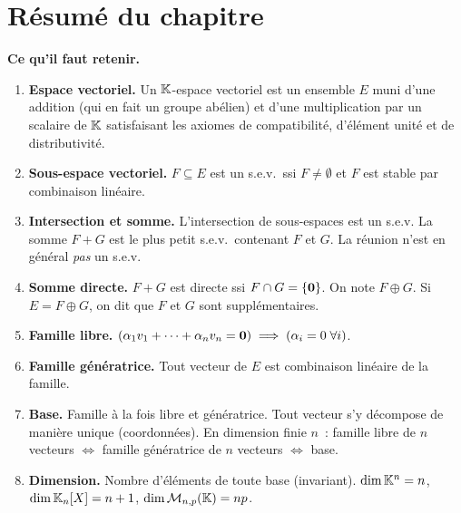 \section*{Résumé du chapitre}

\begin{framed}
\textbf{Ce qu'il faut retenir.}

\begin{enumerate}[label=\textbf{\arabic*.},leftmargin=2em]
  \item \textbf{Espace vectoriel.} Un ${\mathbb{K}}$-espace vectoriel est un
    ensemble $E$ muni d'une addition (qui en fait un groupe abélien) et
    d'une multiplication par un scalaire de ${\mathbb{K}}$ satisfaisant les
    axiomes de compatibilité, d'élément unité et de distributivité.

  \item \textbf{Sous-espace vectoriel.} $F\subseteq E$ est un s.e.v.\
    ssi $F\neq\emptyset$ et $F$ est stable par combinaison linéaire.

  \item \textbf{Intersection et somme.} L'intersection de sous-espaces
    est un s.e.v. La somme $F+G$ est le plus petit s.e.v.\ contenant
    $F$ et $G$. La réunion n'est en général \emph{pas} un s.e.v.

  \item \textbf{Somme directe.} $F+G$ est directe ssi
    $F\cap G=\left\{\mathbf{0}\right\}$. On note $F\oplus G$. Si $E=F\oplus G$,
    on dit que $F$ et $G$ sont supplémentaires.

  \item \textbf{Famille libre.} $(\alpha_1 v_1+\cdots+\alpha_n v_n
    =\mathbf{0}) \implies (\alpha_i=0\;\forall i)$.

  \item \textbf{Famille génératrice.} Tout vecteur de $E$ est
    combinaison linéaire de la famille.

  \item \textbf{Base.} Famille à la fois libre et génératrice. Tout
    vecteur s'y décompose de manière unique (coordonnées). En dimension
    finie $n$~: famille libre de $n$ vecteurs $\iff$ famille
    génératrice de $n$ vecteurs $\iff$ base.

  \item \textbf{Dimension.} Nombre d'éléments de toute base (invariant).
    $\dim{\mathbb{K}}^n=n$, $\dim{\mathbb{K}}_n[X]=n+1$, $\dim\mathcal{M}_{n,p}({\mathbb{K}})=np$.


\end{enumerate}
\end{framed}
